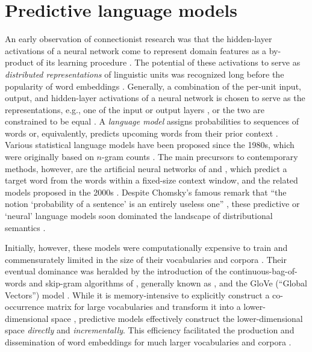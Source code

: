 \section{Predictive language models}
\label{predictive-language-models}

An early observation of connectionist research was that the hidden-layer activations of
a neural network come to represent domain features as a by-product of its learning
procedure \parencites{Rumelhart1986}.
The potential of these activations to serve as \emph{distributed representations} of
linguistic units was recognized long before the popularity of word embeddings
\parencites{Hinton1986}{Elman1991}.
Generally, a combination of the per-unit input, output, and hidden-layer activations of
a neural network is chosen to serve as the representations, e.g., one of the input or
output layers \parencites[142]{Bengio2006}[642]{Mnih2007}[161-162]{Collobert2008}, or
the two are constrained to be equal \parencites{Press2017}.
A \emph{language model} assigns probabilities to sequences of words or, equivalently,
predicts upcoming words from their prior context \parencites[32,134]{Jurafsky2023}.
Various statistical language models have been proposed since the 1980s, which were
originally based on $n$-gram counts \parencites{Rosenfeld2000}.
The main precursors to contemporary methods, however, are the artificial neural
networks of \textcites{Xu2000} and \textcites{Bengio2000}, which predict a target word
from the words within a fixed-size context window, and the related models proposed in
the 2000s \parencites[384-387]{Turian2010}.
Despite Chomsky's famous remark that ``the notion `probability of a sentence' is an
entirely useless one'' \parencites*[57]{Chomsky1969}, these predictive or `neural'
language models soon dominated the landscape of distributional semantics
\parencites{Baroni2014a}.

Initially, however, these models were computationally expensive to train and
commensurately limited in the size of their vocabularies and corpora
\parencites[e.g.][203]{Xu2000}[1]{Alexandrescu2006}[641]{Mnih2007}[386]{Turian2010}.
Their eventual dominance was heralded by the introduction of the
continuous-bag-of-words and skip-gram algorithms of \textcites{Mikolov2013}, generally
known as \wordvec{}, and the GloVe (``Global Vectors'') model
\parencites{Pennington2014}.
While it is memory-intensive to explicitly construct a co-occurrence matrix for large
vocabularies and transform it into a lower-dimensional space
\parencites[385]{Turian2010}, predictive models effectively construct the
lower-dimensional space \emph{directly} and \emph{incrementally}.
This efficiency facilitated the production and dissemination of word embeddings for
much larger vocabularies and corpora
\parencites[7-8]{Mikolov2013a}[1536]{Pennington2014}.

